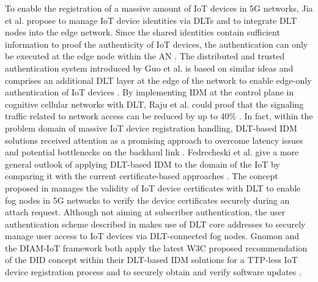 \documentclass[conference]{IEEEtran}
\begin{document}
To enable the registration of a massive amount of IoT devices in 5G networks, Jia et al. propose to manage IoT device identities via DLTs and to integrate DLT nodes into the edge network. Since the shared identities contain sufficient information to proof the authenticity of IoT devices, the authentication can only be executed at the edge node within the AN \cite{Jia.2020}. The distributed and trusted authentication system introduced by Guo et al. is based on similar ideas and comprises an additional DLT layer at the edge of the network to enable edge-only authentication of IoT devices \cite{Guo.2020}. By implementing IDM at the control plane in cognitive cellular networks with DLT, Raju et al. could proof that the signaling traffic related to network access can be reduced by up to 40\% \cite{Raju.2017}. In fact, within the problem domain of massive IoT device registration handling, DLT-based IDM solutions received attention as a promising approach to overcome latency issues and potential bottlenecks on the backhaul link \cite{Jia.2020, Fedrecheski.2020, Guo.2020, Raju.2017}. Fedrecheski et al. give a more general outlook of applying DLT-based IDM to the domain of the IoT by comparing it with the current certificate-based approaches \cite{Fedrecheski.2020}. The concept proposed in \cite{T.Hewa.2020} manages the validity of IoT device certificates with DLT to enable fog nodes in 5G networks to verify the device certificates securely during an attach request. Although not aiming at subscriber authentication, the user authentication scheme described in \cite{R.Almadhoun.2018} makes use of DLT core addresses to securely manage user access to IoT devices via DLT-connected fog nodes. Gnomon \cite{R.Ansey.2019} and the DIAM-IoT framework \cite{XinxinFan.2020} both apply the latest W3C proposed recommendation of the DID concept within their DLT-based IDM solutions for a TTP-less IoT device registration process \cite{XinxinFan.2020, R.Ansey.2019} and to securely obtain and verify software updates \cite{R.Ansey.2019}.        
\end{document}

